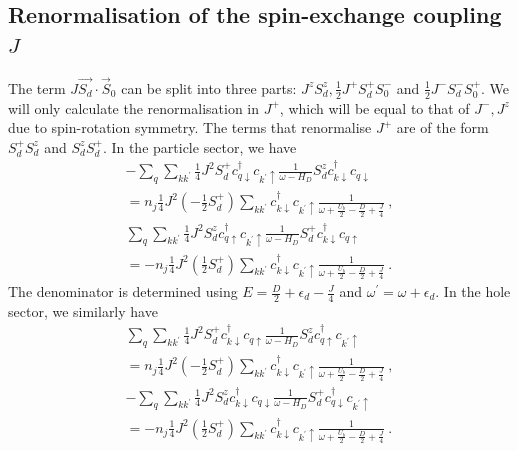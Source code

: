 \documentclass[reprint,superscriptaddress,floatfix]{revtex4-2}
\begin{document}
\subsection{Renormalisation of the spin-exchange coupling \(J\)}
The term \(J \vec{S_d}\cdot\vec{S}_0\) can be split into three parts: \(J^z S_d^z, \frac{1}{2}J^+ S_d^+ S_0^-\) and \(\frac{1}{2}J^- S_d^- S_0^+\). We will only calculate the renormalisation in \(J^+\), which will be equal to that of \(J^-,J^z\) due to spin-rotation symmetry. The terms that renormalise \(J^+\) are of the form \(S_d^+ S_d^z\) and \(S_d^z S_d^+\). In the particle sector, we have
\begin{equation}\begin{aligned}
	-\sum_{q} \sum_{kk^\prime}\frac{1}{4}J^2 S_d^+ c^\dagger_{q\downarrow}c_{k^\prime \uparrow} \frac{1}{\omega - H_D}S_d^z c^\dagger_{k \downarrow}c_{q \downarrow} \\
	= n_j \frac{1}{4}J^2 \left(-\frac{1}{2}S_d^+\right) \sum_{kk^\prime}c^\dagger_{k \downarrow}c_{k^\prime \uparrow} \frac{1}{\omega + \frac{U_b}{2} - \frac{D}{2} + \frac{J}{4}}~,\\
	\sum_{q} \sum_{kk^\prime} \frac{1}{4}J^2 S_d^z c^\dagger_{q \uparrow}c_{k^\prime \uparrow} \frac{1}{\omega - H_D} S_d^+ c^\dagger_{k\downarrow}c_{q \uparrow} \\
	= -n_j \frac{1}{4}J^2 \left(\frac{1}{2}S_d^+\right) \sum_{kk^\prime}c^\dagger_{k \downarrow}c_{k^\prime \uparrow} \frac{1}{\omega + \frac{U_b}{2} - \frac{D}{2} + \frac{J}{4}}~.
\end{aligned}\end{equation}
The denominator is determined using \(E = \frac{D}{2} + \epsilon_d - \frac{J}{4}\) and \(\omega^\prime = \omega + \epsilon_d\).
In the hole sector, we similarly have
\begin{equation}\begin{aligned}
	\sum_{q} \sum_{kk^\prime}\frac{1}{4}J^2 S_d^+ c^\dagger_{k\downarrow}c_{q \uparrow} \frac{1}{\omega - H_D}S_d^z c^\dagger_{q \uparrow}c_{k^\prime \uparrow}\\
	= n_j \frac{1}{4}J^2 \left(-\frac{1}{2}S_d^+\right) \sum_{kk^\prime}c^\dagger_{k \downarrow}c_{k^\prime \uparrow} \frac{1}{\omega + \frac{U_b}{2} - \frac{D}{2} + \frac{J}{4}}~,\\
	-\sum_{q} \sum_{kk^\prime} \frac{1}{4}J^2 S_d^z c^\dagger_{k \downarrow}c_{q \downarrow} \frac{1}{\omega - H_D} S_d^+ c^\dagger_{q\downarrow}c_{k^\prime \uparrow} \\
	= -n_j \frac{1}{4}J^2 \left(\frac{1}{2}S_d^+\right) \sum_{kk^\prime}c^\dagger_{k \downarrow}c_{k^\prime \uparrow} \frac{1}{\omega + \frac{U_b}{2} - \frac{D}{2} + \frac{J}{4}}~.
\end{aligned}\end{equation}
\end{document}
